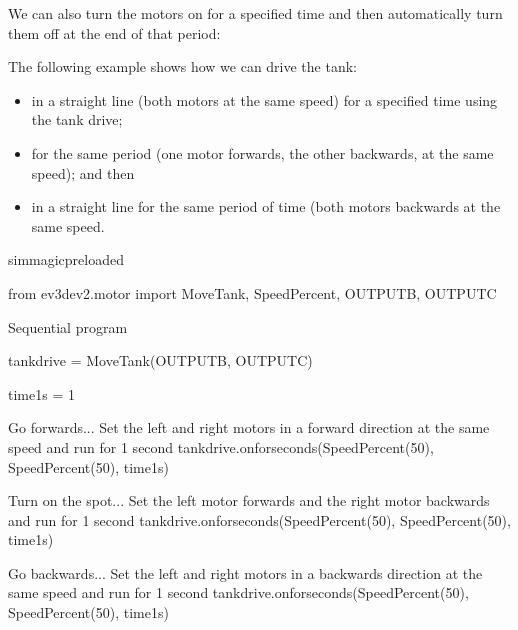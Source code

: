 \documentclass[letterpaper,10pt,english]{sphinxmanual}
\begin{document}
We can also turn the motors on for a specified time and then automatically turn them off at the end of that period:

\begin{sphinxVerbatim}[commandchars=\\\{\}]
  
\end{sphinxVerbatim}

The following example shows how we can drive the tank:
\begin{itemize}
\item {} 
 in a straight line (both motors at the same speed) for a specified time using the tank drive;

\item {} 
 for the same period (one motor forwards, the other backwards, at the same speed); and then

\item {} 
 in a straight line for the same period of time (both motors backwards at the same speed.

\end{itemize}


{
\begin{sphinxVerbatim}[commandchars=\\\{\}]
\llap{\color{nbsphinxin}[ ]:\,\hspace{\fboxrule}\hspace{\fboxsep}}\PYGZpc{}\PYGZpc{}sim\PYGZus{}magic\PYGZus{}preloaded

from ev3dev2.motor import MoveTank, SpeedPercent, OUTPUT\PYGZus{}B, OUTPUT\PYGZus{}C

\PYGZsh{} Sequential program

tank\PYGZus{}drive = MoveTank(OUTPUT\PYGZus{}B, OUTPUT\PYGZus{}C)

time\PYGZus{}1s = 1

\PYGZsh{} Go forwards...
\PYGZsh{} Set the left and right motors in a forward direction at the same speed
\PYGZsh{} and run for 1 second
tank\PYGZus{}drive.on\PYGZus{}for\PYGZus{}seconds(SpeedPercent(50), SpeedPercent(50), time\PYGZus{}1s)


\PYGZsh{} Turn on the spot...
\PYGZsh{} Set the left motor forwards and the right motor backwards
\PYGZsh{} and run for 1 second
tank\PYGZus{}drive.on\PYGZus{}for\PYGZus{}seconds(SpeedPercent(50), SpeedPercent(\PYGZhy{}50), time\PYGZus{}1s)


\PYGZsh{} Go backwards...
\PYGZsh{} Set the left and right motors in a backwards direction at the same speed
\PYGZsh{} and run for 1 second
tank\PYGZus{}drive.on\PYGZus{}for\PYGZus{}seconds(SpeedPercent(\PYGZhy{}50), SpeedPercent(\PYGZhy{}50), time\PYGZus{}1s)
\end{sphinxVerbatim}
}
\end{document}
